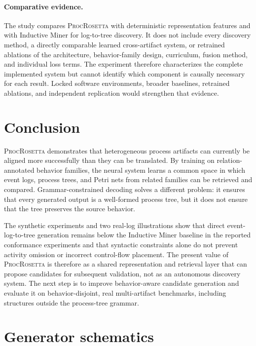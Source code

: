 \documentclass[pdflatex,sn-basic]{sn-jnl}
\newcommand{\model}{\textsc{ProcRosetta}\xspace}
\begin{document}
\paragraph{Comparative evidence.}
The study compares \model with deterministic representation features and with Inductive Miner for log-to-tree discovery. It does not include every discovery method, a directly comparable learned cross-artifact system, or retrained ablations of the architecture, behavior-family design, curriculum, fusion method, and individual loss terms. The experiment therefore characterizes the complete implemented system but cannot identify which component is causally necessary for each result. Locked software environments, broader baselines, retrained ablations, and independent replication would strengthen that evidence.

\FloatBarrier
\section{Conclusion}\label{sec:conclusion}

\model demonstrates that heterogeneous process artifacts can currently be aligned more successfully than they can be translated. By training on relation-annotated behavior families, the neural system learns a common space in which event logs, process trees, and Petri nets from related families can be retrieved and compared. Grammar-constrained decoding solves a different problem: it ensures that every generated output is a well-formed process tree, but it does not ensure that the tree preserves the source behavior.

The synthetic experiments and two real-log illustrations show that direct event-log-to-tree generation remains below the Inductive Miner baseline in the reported conformance experiments and that syntactic constraints alone do not prevent activity omission or incorrect control-flow placement. The present value of \model is therefore as a shared representation and retrieval layer that can propose candidates for subsequent validation, not as an autonomous discovery system. The next step is to improve behavior-aware candidate generation and evaluate it on behavior-disjoint, real multi-artifact benchmarks, including structures outside the process-tree grammar.

\FloatBarrier

\appendix

\section{Generator schematics}\label{app:generator-schematics}
\end{document}
